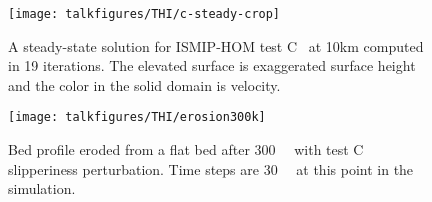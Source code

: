 \begin{figure}\centering
  \texttt{[image: talkfigures/THI/c-steady-crop]}
  \caption{A steady-state solution for ISMIP-HOM test C~\cite{pattyn2008beh} at 10km computed in 19 iterations.
    The elevated surface is exaggerated surface height and the color in the solid domain is velocity.}\label{fig:hstat:csteady}
\end{figure}

\begin{figure}\centering
  \texttt{[image: talkfigures/THI/erosion300k]}
  \caption{Bed profile eroded from a flat bed after \SI{300}{\kilo\year} with test C slipperiness perturbation.
    Time steps are \SI{30}{\kilo\year} at this point in the simulation.}\label{fig:hstat:erosion300k}
\end{figure}
